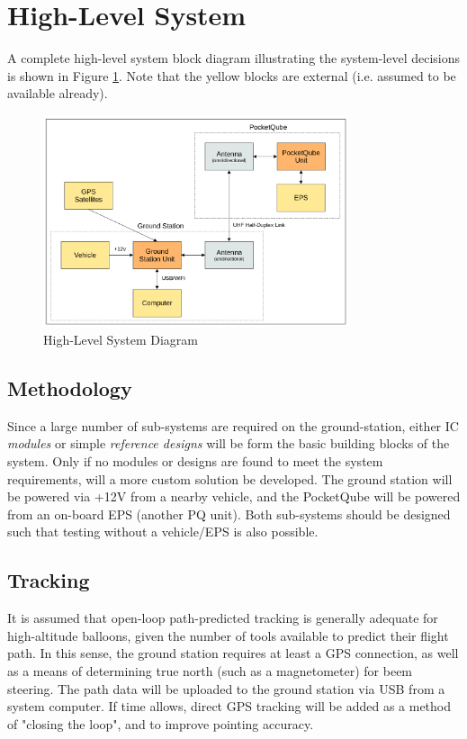 \graphicspath{{./figures}}

\section{High-Level System}
A complete high-level system block diagram illustrating the system-level decisions is shown in Figure \ref{fig:complete_system}. Note that the yellow blocks are external (i.e. assumed to be available already).

\begin{figure}[!htb]
    \centering
    \includegraphics[width=0.8\textwidth]{complete_system.png}
    \caption{High-Level System Diagram}
    \label{fig:complete_system}
  \end{figure}

\newpage
\subsection{Methodology}
Since a large number of sub-systems are required on the ground-station, either IC \textit{modules} or simple \textit{reference designs} will be form the basic building blocks of the system. Only if no modules or designs are found to meet the system requirements, will a more custom solution be developed. The ground station will be powered via +12V from a nearby vehicle, and the PocketQube will be powered from an on-board EPS (another PQ unit). Both sub-systems should be designed such that testing without a vehicle/EPS is also possible.

\subsection{Tracking}
It is assumed that open-loop path-predicted tracking is generally adequate for high-altitude balloons, given the number of tools available to predict their flight path. In this sense, the ground station requires at least a GPS connection, as well as a means of determining true north (such as a magnetometer) for beem steering. The path data will be uploaded to the ground station via USB from a system computer. If time allows, direct GPS tracking will be added as a method of "closing the loop", and to improve pointing accuracy.

